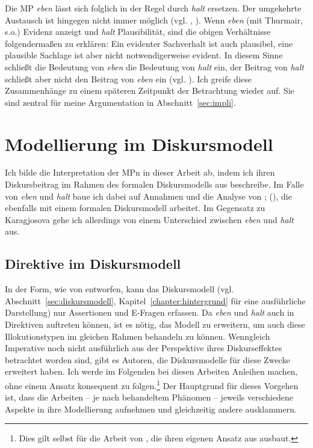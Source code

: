 Die MP \textit{eben} lässt sich folglich in der Regel durch \textit{halt} ersetzen. Der umgekehrte Austausch ist hingegen nicht immer möglich (vgl. \citealt[128]{Thurmair1989}, \citealt[392]{Ickler1994}). Wenn \textit{eben} (mit Thurmair, s.o.) Evidenz anzeigt und \textit{halt} Plausibilität, sind die obigen Verhältnisse folgendermaßen zu erklären: Ein evidenter Sachverhalt ist auch plausibel, eine plausible Sachlage ist aber nicht notwendigerweise evident. In diesem Sinne schließt die Bedeutung von \textit{eben} die Bedeutung von \textit{halt} ein, der Beitrag von \textit{halt} schließt aber nicht den Beitrag von \textit{eben} ein (vgl. \citealt[128]{Thurmair1989}). Ich greife diese Zusammenhänge zu einem späteren Zeitpunkt der Betrachtung wieder auf. Sie sind zentral für meine Argumentation in Abschnitt~\ref{sec:impli}.

\section{Modellierung im Diskursmodell}
\label{sec:modellierung}
Ich bilde die Interpretation der MPn in dieser Arbeit ab, indem ich ihren Diskursbeitrag im Rahmen des formalen Diskursmodells aus \citet{Farkas2010} be\-schreibe. Im Falle von \textit{eben} und \textit{halt} baue ich dabei auf Annahmen und die Analyse von \citet{Karagjosova2003}; (\citeyear{Karagjosova2004}), die ebenfalls mit einem formalen Diskurs\-modell arbeitet. Im Gegensatz zu Karagjosova gehe ich allerdings von einem Unterschied zwischen \textit{eben} und \textit{halt} aus. 

\subsection{Direktive im Diskursmodell}
\label{sec:dirdm}
In der Form, wie von \citet{Farkas2010} entworfen, kann das Diskursmodell (vgl. Abschnitt~\ref{sec:diskursmodell}, Kapitel~\ref{chapter:hintergrund} für eine ausführliche Darstellung) nur Assertionen und E-Fragen erfassen. Da \textit{eben} und \textit{halt} auch in Direktiven  auftreten können, ist es nötig, das Modell zu erweitern, um auch diese Illokutionstypen im gleichen Rahmen behandeln zu können. Wenngleich Imperative noch nicht ausführlich aus der Perspektive ihres Diskurseffektes betrachtet worden sind, gibt es Autoren, die Diskursmodelle für diese Zwecke erweitert haben. Ich werde im Folgenden bei diesen Arbeiten Anleihen machen, ohne einem Ansatz konsequent zu folgen.\footnote{Dies gilt selbst für die Arbeit von \citet{Farkas2011}, die ihren eigenen Ansatz aus \citet{Farkas2010} ausbaut.} Der Hauptgrund für dieses Vorgehen ist, dass die Arbeiten – je nach behandeltem Phänomen – jeweils verschiedene Aspekte in ihre Modellierung aufnehmen und gleichzeitig andere ausklammern.

